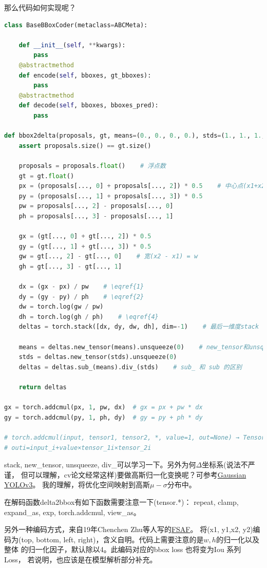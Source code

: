 \documentclass[UTF8]{ctexart}
\begin{document}
那么代码如何实现呢？

\lstset{style=mystyle}
\begin{lstlisting}[language=Python]
class BaseBBoxCoder(metaclass=ABCMeta):

	def __init__(self, **kwargs):
		pass
	@abstractmethod
	def encode(self, bboxes, gt_bboxes):
		pass
	@abstractmethod
	def decode(self, bboxes, bboxes_pred):
		pass

def bbox2delta(proposals, gt, means=(0., 0., 0., 0.), stds=(1., 1., 1., 1.)):
	assert proposals.size() == gt.size()

	proposals = proposals.float()    # 浮点数
	gt = gt.float()
	px = (proposals[..., 0] + proposals[..., 2]) * 0.5    # 中心点(x1+x2)/2
	py = (proposals[..., 1] + proposals[..., 3]) * 0.5 
	pw = proposals[..., 2] - proposals[..., 0]    
	ph = proposals[..., 3] - proposals[..., 1]

	gx = (gt[..., 0] + gt[..., 2]) * 0.5    
	gy = (gt[..., 1] + gt[..., 3]) * 0.5
	gw = gt[..., 2] - gt[..., 0]    # 宽(x2 - x1) = w
	gh = gt[..., 3] - gt[..., 1]

	dx = (gx - px) / pw    # \eqref{1}
	dy = (gy - py) / ph    # \eqref{2}
	dw = torch.log(gw / pw)
	dh = torch.log(gh / ph)    # \eqref{4}
	deltas = torch.stack([dx, dy, dw, dh], dim=-1)    # 最后一维度stack

	means = deltas.new_tensor(means).unsqueeze(0)    # new_tensor和unsqueeze(扩张维度)
	stds = deltas.new_tensor(stds).unsqueeze(0)
	deltas = deltas.sub_(means).div_(stds)    # sub_ 和 sub 的区别

	return deltas

gx = torch.addcmul(px, 1, pw, dx)  # gx = px + pw * dx
gy = torch.addcmul(py, 1, ph, dy)  # gy = py + ph * dy

# torch.addcmul(input, tensor1, tensor2, *, value=1, out=None) → Tensor
# outi​=input_i​+value×tensor_1i​×tensor_2i​
\end{lstlisting}

stack, new\_tensor, unsqueeze, div\_可以学习一下。另外为何$\Delta$坐标系(说法不严谨，
但可以理解，cv论文经常这样)要做高斯归一化变换呢？可参考\href{https://arxiv.org/abs/1904.04620}{Gaussian YOLOv3}。
我的理解，将优化空间映射到高斯$\mu-\sigma$分布中。

在解码函数delta2bbox有如下函数需要注意一下(tensor.*)：
repeat, clamp, expand\_as, exp, torch.addcmul, view\_as。

另外一种编码方式，来自19年Chenchen Zhu等人写的\href{https://arxiv.org/abs/1903.00621}{FSAF}。
将(x1, y1,x2, y2)编码为(top, bottom, left, right)，含义自明。代码上需要注意的是$w, h$的归一化以及整体
的归一化因子，默认除以4。此编码对应的bbox loss 也将变为Iou 系列 Loss， 若说明，也应该是在模型解析部分补充。
\end{document}
